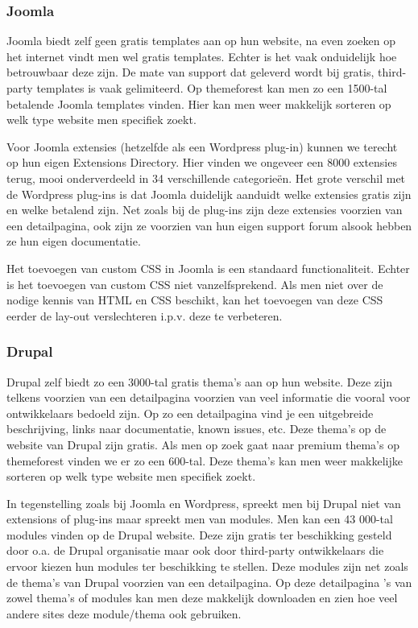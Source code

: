 \subsubsection{Joomla}
Joomla biedt zelf geen gratis templates aan op hun website, na even zoeken op het internet vindt men wel gratis templates. Echter is het vaak onduidelijk hoe betrouwbaar deze zijn. De mate van support dat geleverd wordt bij gratis, third-party templates is vaak gelimiteerd. Op themeforest kan men zo een 1500-tal betalende Joomla templates vinden. Hier kan men weer makkelijk sorteren op welk type website men specifiek zoekt.

Voor Joomla extensies (hetzelfde als een Wordpress plug-in) kunnen we terecht op hun eigen Extensions Directory. Hier vinden we ongeveer een 8000 extensies terug, mooi onderverdeeld in 34 verschillende categorieën. Het grote verschil met de Wordpress plug-ins is dat Joomla duidelijk aanduidt welke extensies gratis zijn en welke betalend zijn. Net zoals bij de plug-ins zijn deze extensies voorzien van een detailpagina, ook zijn ze voorzien van hun eigen support forum alsook hebben ze hun eigen documentatie.

Het toevoegen van custom CSS in Joomla is een standaard functionaliteit. Echter is het toevoegen van custom CSS niet vanzelfsprekend. Als men niet over de nodige kennis van HTML en CSS beschikt, kan het toevoegen van deze CSS eerder de lay-out verslechteren i.p.v. deze te verbeteren.
\subsubsection{Drupal}
Drupal zelf biedt zo een 3000-tal gratis thema's aan op hun website. Deze zijn telkens voorzien van een detailpagina voorzien van veel informatie die vooral voor ontwikkelaars bedoeld zijn. Op zo een detailpagina vind je een uitgebreide beschrijving, links naar documentatie, known issues, etc. Deze thema's op de website van Drupal zijn gratis. Als men op zoek gaat naar premium thema's op themeforest vinden we er zo een 600-tal. Deze thema's kan men weer makkelijke sorteren op welk type website men specifiek zoekt. 

In tegenstelling zoals bij Joomla en Wordpress, spreekt men bij Drupal niet van extensions of plug-ins maar spreekt men van modules. Men kan een 43 000-tal modules vinden op de Drupal website. Deze zijn gratis ter beschikking gesteld door o.a. de Drupal organisatie maar ook door third-party ontwikkelaars die ervoor kiezen hun modules ter beschikking te stellen. Deze modules zijn net zoals de thema's van Drupal voorzien van een detailpagina. Op deze detailpagina 's van zowel thema's of modules kan men deze makkelijk downloaden en zien hoe veel andere sites deze module/thema ook gebruiken.

